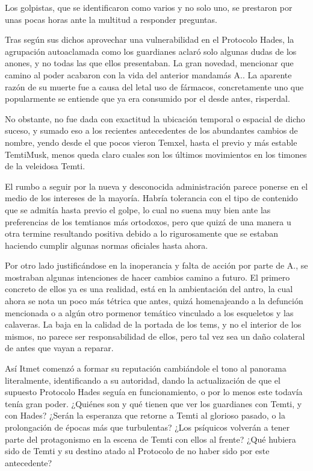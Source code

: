 \documentclass[
  spanish,
]{book}
\begin{document}
Los golpistas, que se identificaron como varios y no solo uno, se prestaron por unas pocas horas ante la multitud a responder preguntas.

Tras según sus dichos aprovechar una vulnerabilidad en el Protocolo Hades, la agrupación autoaclamada como los guardianes aclaró solo algunas dudas de los anones, y no todas las que ellos presentaban. La gran novedad, mencionar que camino al poder acabaron con la vida del anterior mandamás A.. La aparente razón de su muerte fue a causa del letal uso de fármacos, concretamente uno que popularmente se entiende que ya era consumido por el desde antes, risperdal.

No obstante, no fue dada con exactitud la ubicación temporal o espacial de dicho suceso, y sumado eso a los recientes antecedentes de los abundantes cambios de nombre, yendo desde el que pocos vieron Temxel, hasta el previo y más estable TemtiMusk, menos queda claro cuales son los últimos movimientos en los timones de la veleidosa Temti.

El rumbo a seguir por la nueva y desconocida administración parece ponerse en el medio de los intereses de la mayoría. Habría tolerancia con el tipo de contenido que se admitía hasta previo el golpe, lo cual no suena muy bien ante las preferencias de los temtianos más ortodoxos, pero que quizá de una manera u otra termine resultando positiva debido a lo rigurosamente que se estaban haciendo cumplir algunas normas oficiales hasta ahora.

Por otro lado justificándose en la inoperancia y falta de acción por parte de A., se mostraban algunas intenciones de hacer cambios camino a futuro. El primero concreto de ellos ya es una realidad, está en la ambientación del antro, la cual ahora se nota un poco más tétrica que antes, quizá homenajeando a la defunción mencionada o a algún otro pormenor temático vinculado a los esqueletos y las calaveras. La baja en la calidad de la portada de los tems, y no el interior de los mismos, no parece ser responsabilidad de ellos, pero tal vez sea un daño colateral de antes que vayan a reparar.

Así Itmet comenzó a formar su reputación cambiándole el tono al panorama literalmente, identificando a su autoridad, dando la actualización de que el supuesto Protocolo Hades seguía en funcionamiento, o por lo menos este todavía tenía gran poder. ¿Quiénes son y qué tienen que ver los guardianes con Temti, y con Hades? ¿Serán la esperanza que retorne a Temti al glorioso pasado, o la prolongación de épocas más que turbulentas? ¿Los psíquicos volverán a tener parte del protagonismo en la escena de Temti con ellos al frente? ¿Qué hubiera sido de Temti y su destino atado al Protocolo de no haber sido por este antecedente?
\end{document}
